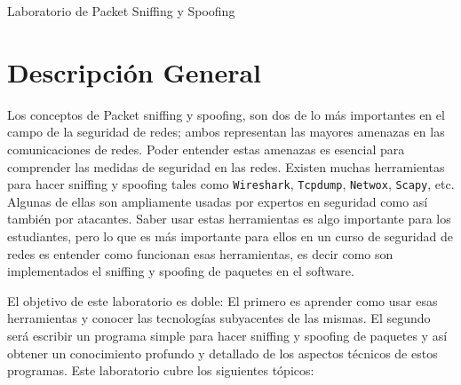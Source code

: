 
\newcommand{\commonfolder}{../../common-files}




\newcommand{\pcap} {\texttt{pcap}\xspace}
\newcommand{\telnet} {\texttt{telnet}\xspace}







\begin{center}
{\LARGE Laboratorio de Packet Sniffing y Spoofing}
\end{center}



\setcounter{task}{1}
\newcommand{\tasks} {\bf {\noindent (\arabic{task})} \addtocounter{task}{1} \,}

\section{Descripción General}

Los conceptos de Packet sniffing y spoofing, son dos de lo más importantes en el campo de la seguridad de redes; ambos representan las mayores amenazas en las comunicaciones de redes. Poder entender estas amenazas es esencial para comprender las medidas de seguridad en las redes. Existen muchas herramientas para hacer sniffing y spoofing tales como {\tt Wireshark}, {\tt Tcpdump}, {\tt Netwox}, \texttt{Scapy}, etc.
Algunas de ellas son ampliamente usadas por expertos en seguridad como así también por atacantes. Saber usar estas herramientas es algo importante para los estudiantes, pero lo que es más importante para ellos en un curso de seguridad de redes es entender como funcionan esas herramientas, es decir como son implementados el sniffing y spoofing de paquetes en el software.

El objetivo de este laboratorio es doble: El primero es aprender como usar esas herramientas y conocer las tecnologías subyacentes de las mismas.
El segundo será escribir un programa simple para hacer sniffing y spoofing de paquetes y así obtener un conocimiento profundo y detallado de los aspectos técnicos de estos programas.
Este laboratorio cubre los siguientes tópicos:


